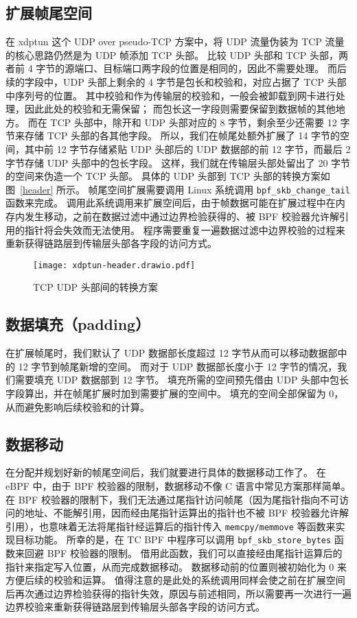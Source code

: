 \subsection{扩展帧尾空间}

在 xdptun 这个 UDP over pseudo-TCP 方案中，将 UDP 流量伪装为 TCP 流量的核心思路仍然是为 UDP 帧添加 TCP 头部。
比较 UDP 头部和 TCP 头部，两者前 4 字节的源端口、目标端口两字段的位置是相同的，因此不需要处理。
而后续的字段中，UDP 头部上剩余的 4 字节是包长和校验和，对应占据了 TCP 头部中序列号的位置。
其中校验和作为传输层的校验和，一般会被卸载到网卡进行处理，因此此处的校验和无需保留；
而包长这一字段则需要保留到数据帧的其他地方。
而在 TCP 头部中，除开和 UDP 头部对应的 8 字节，剩余至少还需要 12 字节来存储 TCP 头部的各其他字段。
所以，我们在帧尾处额外扩展了 14 字节的空间，其中前 12 字节存储紧贴 UDP 头部后的 UDP 数据部的前 12 字节，而最后 2 字节存储 UDP 头部中的包长字段。
这样，我们就在传输层头部处留出了 20 字节的空间来伪造一个 TCP 头部。
具体的 UDP 头部到 TCP 头部的转换方案如图~\ref{header} 所示。
帧尾空间扩展需要调用 Linux 系统调用 \texttt{bpf\_skb\_change\_tail} 函数来完成。
调用此系统调用来扩展空间后，由于帧数据可能在扩展过程中在内存内发生移动，之前在数据过滤中通过边界检验获得的、被 BPF 校验器允许解引用的指针将会失效而无法使用。
程序需要重复一遍数据过滤中边界校验的过程来重新获得链路层到传输层头部各字段的访问方式。

\begin{figure}[h]
  \centering
  \texttt{[image: xdptun-header.drawio.pdf]}
  \caption{TCP UDP 头部间的转换方案}
  \label{fig:header}
\end{figure}

\subsection{数据填充（padding）}

在扩展帧尾时，我们默认了 UDP 数据部长度超过 12 字节从而可以移动数据部中的 12 字节到帧尾新增的空间。
而对于 UDP 数据部长度小于 12 字节的情况，我们需要填充 UDP 数据部到 12 字节。
填充所需的空间预先借由 UDP 头部中包长字段算出，并在帧尾扩展时加到需要扩展的空间中。
填充的空间全部保留为 0，从而避免影响后续校验和的计算。

\subsection{数据移动}

在分配并规划好新的帧尾空间后，我们就要进行具体的数据移动工作了。
在 eBPF 中，由于 BPF 校验器的限制，数据移动不像 C 语言中常见方案那样简单。
在 BPF 校验器的限制下，我们无法通过尾指针访问帧尾（因为尾指针指向不可访问的地址、不能解引用，因而经由尾指针运算出的指针也不被 BPF 校验器允许解引用），也意味着无法将尾指针经运算后的指针传入 \texttt{memcpy/memmove} 等函数来实现目标功能。
所幸的是，在 TC BPF 中程序可以调用 \texttt{bpf\_skb\_store\_bytes} 函数来回避 BPF 校验器的限制。
借用此函数，我们可以直接经由尾指针运算后的指针来指定写入位置，从而完成数据移动。
数据移动前的位置则被初始化为 0 来方便后续的校验和运算。
值得注意的是此处的系统调用同样会使之前在扩展空间后再次通过边界检验获得的指针失效，原因与前述相同，所以需要再一次进行一遍边界校验来重新获得链路层到传输层头部各字段的访问方式。

